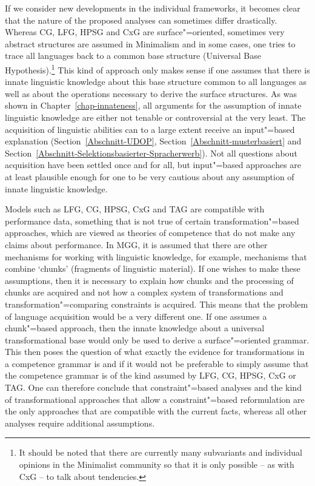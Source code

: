If we consider new developments in the individual frameworks, it becomes clear that the nature of the proposed analyses can sometimes differ drastically.
Whereas CG, LFG, HPSG and CxG are surface"=oriented, sometimes very abstract structures are assumed in Minimalism and in some cases, one tries to trace all languages back
to a common base structure (Universal Base Hypothesis).\footnote{
  It should be noted that there are currently many subvariants and individual opinions in the Minimalist community so that it
  is only possible -- as with CxG -- to talk about tendencies.%
} This kind of approach only makes sense if one assumes that there is innate linguistic knowledge about this base structure
common to all languages as well as about the operations necessary to derive the surface structures.
As was shown in Chapter~\ref{chap-innateness}, all arguments for the assumption of innate linguistic knowledge are either not tenable
or controversial at the very least.
The acquisition of linguistic abilities can to a large extent receive an input"=based explanation
(Section~\ref{Abschnitt-UDOP}, Section~\ref{Abschnitt-musterbasiert} and
Section~\ref{Abschnitt-Selektionsbasierter-Spracherwerb}). Not all questions about acquisition have
been settled once and for all, but input"=based approaches are at least plausible enough for one to be very cautious about any assumption of innate linguistic knowledge.

Models such as LFG, CG, HPSG, CxG and TAG are compatible with performance data, something that is
not true of certain transformation"=based approaches, which are viewed as theories of competence
that do not make any claims about performance. In MGG, it is assumed that there are other mechanisms
for working with linguistic knowledge, for example, mechanisms that combine `chunks' (fragments of linguistic material). If one wishes to make these assumptions,
then it is necessary to explain how chunks and the processing of chunks are acquired and not how a complex system of transformations and transformation"=comparing
constraints is acquired. This means that the problem of language acquisition would be a very different one. If one assumes a chunk"=based approach, then the innate
knowledge about a universal transformational base would only be used to derive a surface"=oriented grammar. This then poses the question of what exactly the evidence
for transformations in a competence grammar is and if it would not be preferable to simply assume that the competence grammar is of the kind assumed by LFG, CG, HPSG,
CxG or TAG. One can therefore conclude that constraint"=based analyses and the kind of
transformational approaches that allow a constraint"=based reformulation are the only approaches that are compatible with the current facts, whereas all other analyses require additional assumptions.

